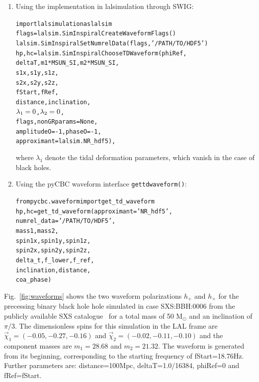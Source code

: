 \documentclass[11pt,tightenlines,article,amssymb,amsmath,amsfonts,superscriptaddress]{revtex4}
\begin{document}
\begin{enumerate}

\item Using the implementation in lalsimulation through SWIG:
\begin{alltt}
import lalsimulation as lalsim
flags = lalsim.SimInspiralCreateWaveformFlags()
lalsim.SimInspiralSetNumrelData(flags,'/PATH/TO/HDF5')
hp, hc = lalsim.SimInspiralChooseTDWaveform(phiRef, 
              deltaT, m1 * MSUN_SI, m2 * MSUN_SI, 
              s1x, s1y, s1z,
              s2x, s2y, s2z, 
              fStart, fRef, 
              distance, inclination,
              \(\lambda\sb{1}=0\), \(\lambda\sb{2}=0\), 
              flags, nonGRparams=None, 
              amplitudeO=-1, phaseO=-1, 
              approximant=lalsim.NR_hdf5),
\end{alltt}
where $\lambda_1$ denote the tidal deformation parameters, which vanish in the case of black holes. 

\item Using the pyCBC waveform interface \texttt{get\textunderscore td\textunderscore waveform()}:
\begin{alltt}
from pycbc.waveform import get_td_waveform 
hp, hc = get_td_waveform(approximant='NR_hdf5', 
                         numrel_data='/PATH/TO/HDF5',
                         mass1, mass2,
                         spin1x, spin1y, spin1z,
                         spin2x, spin2y, spin2z, 
                         delta_t, f_lower, f_ref,
                         inclination, distance, 
                         coa_phase)
\end{alltt}
\end{enumerate}
Fig.~\ref{fig:waveforms} shows the two waveform polarizations $h_+$ and $h_{\times}$ for the precessing binary black hole hole simulated in case 
SXS:BBH:0006 from the publicly available SXS catalogue~\cite{Mroue:2013xna} for a total mass of 50 $\mathrm{M}_\odot$ and an inclination of $\pi/3$. The dimensionless spins for this simulation in the LAL frame are 
$\vec{\chi}_1=(-0.05, -0.27, -0.16)$ and $\vec{\chi}_2=(-0.02, -0.11, -0.10)$ and the component masses are $m_1=28.68$ and $m_2=21.32$. The waveform is generated from its beginning, corresponding to the starting frequency of fStart=18.76Hz.
Further parameters are: distance=100Mpc, deltaT=1.0/16384, phiRef=0 and fRef=fStart.
\end{document}
